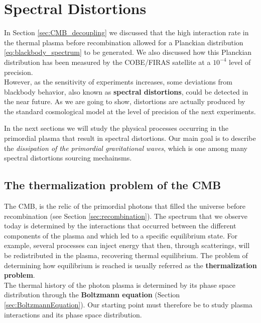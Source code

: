 \chapter{Spectral Distortions}
\label{chap:SpectralDistortions}
In Section \ref{sec:CMB_decoupling} we discussed that the high interaction rate in the thermal plasma before recombination allowed for a Planckian distribution \eqref{eq:blackbody_spectrum} to be generated. We also discussed how this Planckian distribution has been measured by the COBE/FIRAS satellite \cite{COBE1996} at a $10^{-4}$ level of precision.\\
However, as the sensitivity of experiments increases, some deviations from blackbody behavior, also known as \textbf{spectral distortions}, could be detected in the near future. As we are going to show, distortions are actually produced by the standard cosmological model at the level of precision of the next experiments.

In the next sections we will study the physical processes occurring in the primordial plasma that result in spectral distortions. Our main goal is to describe the \emph{dissipation of the primordial gravitational waves}, which is one among many spectral distortions sourcing mechainsms. 

\section{The thermalization problem of the CMB}\label{sec:ThermalizationProblem}
The CMB, is the relic of the primordial photons that filled the universe before recombination (see Section \ref{sec:recombination}). The spectrum that we observe today is determined by the interactions that occurred between the different components of the plasma and which led to a specific equilibrium state. For example, several processes can inject energy that then, through scatterings, will be redistributed in the plasma, recovering thermal equilibrium. The problem of determining how equilibrium is reached is usually referred as the \textbf{thermalization problem}.\\
The thermal history of the photon plasma is determined by its phase space distribution through the \textbf{Boltzmann equation} (Section \ref{sec:BoltzmannEquation}). Our starting point must therefore be to study plasma interactions and its phase space distribution.  

